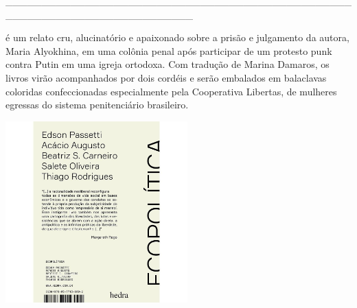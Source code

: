 \hspace*{-2cm}\_\_\_\_\_\_\_\_\_\_\_\_\_\_\_\_\_\_\_\_\_\_\_\_\_\_\_\_\_\_\_\_\_\_\_\_\_\_\_\_\_\_\_\_\_\_\_\_\_\_\_\_\_\_\_\_\_\_\_\_\_\_\_\_\_\_\_\_\_\_\_\_\_\_

\medskip

 é um relato cru, alucinatório e apaixonado sobre a prisão e julgamento da autora, Maria Alyokhina, em uma colônia penal após participar de um protesto punk contra Putin em uma igreja ortodoxa. Com tradução de Marina Damaros, os livros virão acompanhados por dois cordéis e serão embalados em balaclavas coloridas confeccionadas especialmente pela Cooperativa Libertas, de mulheres egressas do sistema penitenciário brasileiro.

\hspace{.5cm}

\hspace*{-.4cm}\begin{minipage}[c]{0.90\linewidth}
\small{
{}}
\end{minipage}

\pagebreak

\hspace{.5cm}

\begin{center}
\hspace*{-1cm}
\hspace{1cm}\includegraphics[width=70mm]{eco.jpeg}
\end{center}

